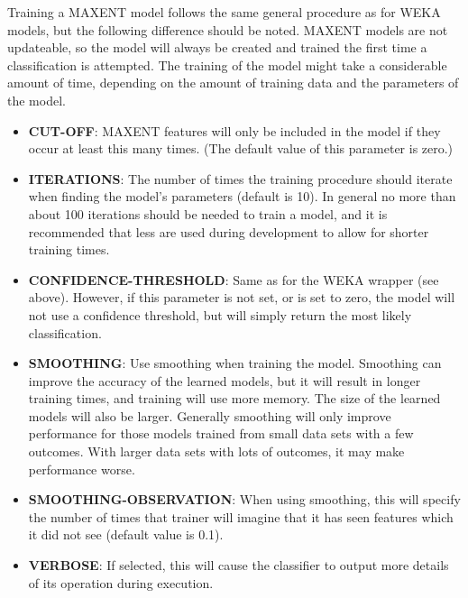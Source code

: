 Training a MAXENT model follows the same general procedure as for WEKA models,
but the following difference should be noted. MAXENT models are not updateable,
so the model will always be created and trained the first time a classification
is attempted. The training of the model might take a considerable amount of time,
depending on the amount of training data and the parameters of the model.


\begin{itemize}
\item
\textbf{CUT-OFF}: MAXENT features will only be included in the model if they occur
at least this many times. (The default value of this parameter is zero.)
\item
\textbf{ITERATIONS}: The number of times the training procedure should iterate when
finding the model's parameters (default is 10). In general no more than about 100
iterations should be needed to train a model, and it is recommended that less are
used during development to allow for shorter training times.
\item
\textbf{CONFIDENCE-THRESHOLD}: Same as for the WEKA wrapper (see above). However,
if this parameter is not set, or is set to zero, the model will not use a confidence
threshold, but will simply return the most likely classification.
\item
\textbf{SMOOTHING}: Use smoothing when training the model. Smoothing can improve
the accuracy of the learned models, but it will result in longer training times,
and training will use more memory. The size of the learned models will also be
larger. Generally smoothing will only improve performance for those models trained
from small data sets with a few outcomes. With larger data sets with lots of
outcomes, it may make performance worse.
\item
\textbf{SMOOTHING-OBSERVATION}: When using smoothing, this will specify the number
of times that trainer will imagine that it has seen features which it did not see
(default value is 0.1).
\item
\textbf{VERBOSE}: If selected, this will cause the classifier to output more
details of its operation during execution.
\end{itemize}



